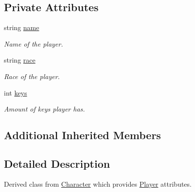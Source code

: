 \subsection*{Private Attributes}
\begin{DoxyCompactItemize}
\item 
string \hyperlink{classPlayer_acf0355128a99ee20ad9931b760fb2de1}{name}
\begin{DoxyCompactList}\small\item\em Name of the player. \end{DoxyCompactList}\item 
string \hyperlink{classPlayer_a5130cb6c4233cd7ad1212af0d1790e58}{race}
\begin{DoxyCompactList}\small\item\em Race of the player. \end{DoxyCompactList}\item 
int \hyperlink{classPlayer_ac46baa685ca2a266178f03b9e9877e65}{keys}
\begin{DoxyCompactList}\small\item\em Amount of keys player has. \end{DoxyCompactList}\end{DoxyCompactItemize}
\subsection*{Additional Inherited Members}


\subsection{Detailed Description}
Derived class from \hyperlink{classCharacter}{Character} which provides \hyperlink{classPlayer}{Player} attributes. 

